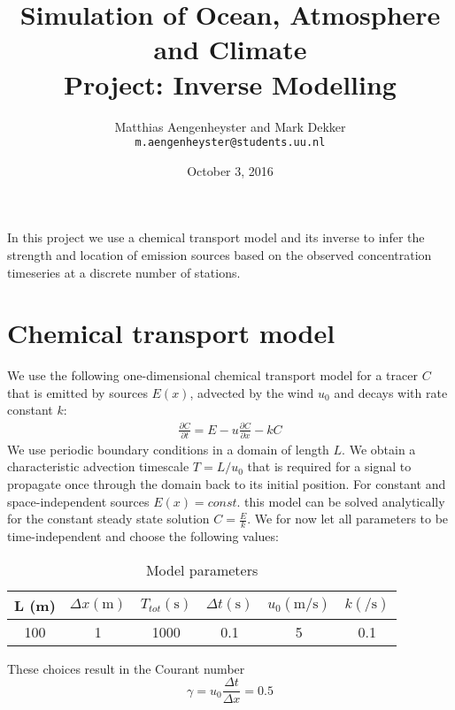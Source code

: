 \documentclass[]{article}
\title{Simulation of Ocean, Atmosphere and Climate \\ Project: Inverse Modelling}
\author{Matthias Aengenheyster and Mark Dekker \\ {\small\texttt{m.aengenheyster@students.uu.nl}}}
\date{October 3, 2016}
\begin{document}
\maketitle

\tableofcontents

\vspace{0.5cm}
In this project we use a chemical transport model and its inverse to infer the strength and location of emission sources based on the observed concentration timeseries at a discrete number of stations.

\section{Chemical transport model}
We use the following one-dimensional chemical transport model for a tracer $C$ that is emitted by sources $E(x)$, advected by the wind $u_0$ and decays with rate constant $k$:
\begin{align}
\frac{\partial C}{\partial t} = E - u \frac{\partial C}{\partial x} - k C
\end{align}
We use periodic boundary conditions in a domain of length $L$. We obtain a characteristic advection timescale $T = L / u_0$ that is required for a signal to propagate once through the domain back to its initial position. For constant and space-independent sources $E(x) = const.$ this model can be solved analytically for the constant steady state solution $C = \frac{E}{k}$.
\newline \newline
We for now let all parameters to be time-independent and choose the following values:

\begin{table}[h]
\begin{center}
\begin{tabular}{|c|c|c|c|c|c|}
\hline  
L (\si{\meter}) & $\Delta x (\si{\meter})$  & $T_{tot} (\si{\second})$  & $\Delta t (\si{\second})$  & $u_0 (\si{\meter\per\second})$ & $k (\si{\per\second})$  \\ 
\hline 
100 & 1 & 1000 & 0.1 & 5 & 0.1 \\
\hline
\end{tabular} 
\caption{Model parameters}
\label{tab:parameters}
\end{center}
\end{table}

These choices result in the Courant number
\begin{equation}
\gamma = u_0 \frac{\Delta t}{\Delta x} = 0.5
\end{equation}
\end{document}
